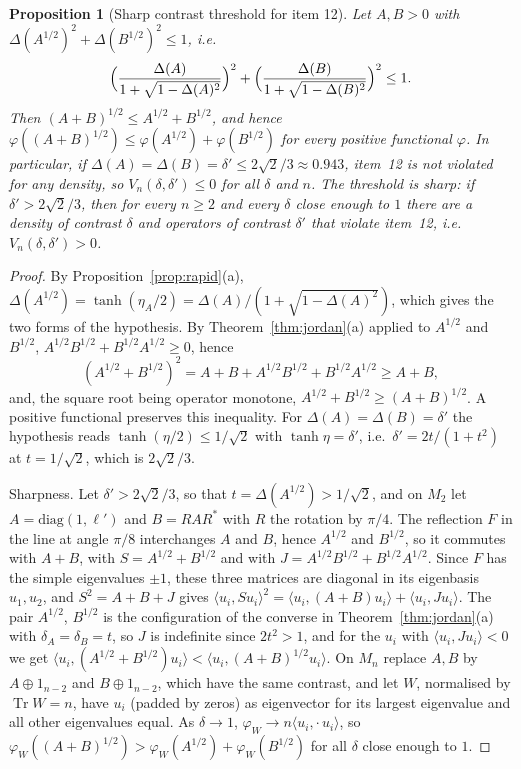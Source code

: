 \documentclass[11pt]{article}
\DeclareMathOperator{\Tr}{Tr}
\theoremstyle{plain}
\newtheorem{proposition}[theorem]{Proposition}
\theoremstyle{definition}
\theoremstyle{remark}
\begin{document}
\begin{proposition}[Sharp contrast threshold for item 12]\label{prop:item12}
Let $A,B>0$ with $\Delta(A^{1/2})^2+\Delta(B^{1/2})^2\le1$, i.e.
\[
  \Bigl(\frac{\Delta(A)}{1+\sqrt{1-\Delta(A)^2}}\Bigr)^2+\Bigl(\frac{\Delta(B)}{1+\sqrt{1-\Delta(B)^2}}\Bigr)^2\le1 .
\]
Then $(A+B)^{1/2}\le A^{1/2}+B^{1/2}$, and hence $\varphi((A+B)^{1/2})\le\varphi(A^{1/2})+\varphi(B^{1/2})$ for every
positive functional $\varphi$. In particular, if $\Delta(A)=\Delta(B)=\delta'\le2\sqrt2/3\approx0.943$, item~12 is not
violated for any density, so $V_n(\delta,\delta')\le0$ for all $\delta$ and $n$. The threshold is sharp: if
$\delta'>2\sqrt2/3$, then for every $n\ge2$ and every $\delta$ close enough to $1$ there are a density of contrast $\delta$
and operators of contrast $\delta'$ that violate item~12, i.e.\ $V_n(\delta,\delta')>0$.
\end{proposition}
\begin{proof}
By Proposition~\ref{prop:rapid}(a), $\Delta(A^{1/2})=\tanh(\eta_A/2)=\Delta(A)/(1+\sqrt{1-\Delta(A)^2})$, which gives the
two forms of the hypothesis. By Theorem~\ref{thm:jordan}(a) applied to $A^{1/2}$ and $B^{1/2}$,
$A^{1/2}B^{1/2}+B^{1/2}A^{1/2}\ge0$, hence
\[
  (A^{1/2}+B^{1/2})^2=A+B+A^{1/2}B^{1/2}+B^{1/2}A^{1/2}\ge A+B ,
\]
and, the square root being operator monotone, $A^{1/2}+B^{1/2}\ge(A+B)^{1/2}$. A positive functional preserves this
inequality. For $\Delta(A)=\Delta(B)=\delta'$ the hypothesis reads $\tanh(\eta/2)\le1/\sqrt2$ with $\tanh\eta=\delta'$, i.e.\
$\delta'=2t/(1+t^2)$ at $t=1/\sqrt2$, which is $2\sqrt2/3$.

Sharpness. Let $\delta'>2\sqrt2/3$, so that $t=\Delta(A^{1/2})>1/\sqrt2$, and on $M_2$ let $A=\mathrm{diag}(1,\ell')$ and
$B=RAR^*$ with $R$ the rotation by $\pi/4$. The reflection $F$ in the line at angle $\pi/8$ interchanges $A$ and $B$, hence
$A^{1/2}$ and $B^{1/2}$, so it commutes with $A+B$, with $S=A^{1/2}+B^{1/2}$ and with $J=A^{1/2}B^{1/2}+B^{1/2}A^{1/2}$.
Since $F$ has the simple eigenvalues $\pm1$, these three matrices are diagonal in its eigenbasis $u_1,u_2$, and
$S^2=A+B+J$ gives $\langle u_i,Su_i\rangle^2=\langle u_i,(A+B)u_i\rangle+\langle u_i,Ju_i\rangle$. The pair $A^{1/2}$,
$B^{1/2}$ is the configuration of the converse in Theorem~\ref{thm:jordan}(a) with $\delta_A=\delta_B=t$, so $J$ is
indefinite since $2t^2>1$, and for the $u_i$ with $\langle u_i,Ju_i\rangle<0$ we get
$\langle u_i,(A^{1/2}+B^{1/2})u_i\rangle<\langle u_i,(A+B)^{1/2}u_i\rangle$. On $M_n$ replace $A,B$ by $A\oplus1_{n-2}$ and
$B\oplus1_{n-2}$, which have the same contrast, and let $W$, normalised by $\Tr W=n$, have $u_i$ (padded by zeros) as
eigenvector for its largest eigenvalue and all other eigenvalues equal. As $\delta\to1$, $\varphi_W\to n\langle
u_i,\cdot\,u_i\rangle$, so
$\varphi_W((A+B)^{1/2})>\varphi_W(A^{1/2})+\varphi_W(B^{1/2})$ for all $\delta$ close enough to $1$.
\end{proof}
\end{document}
